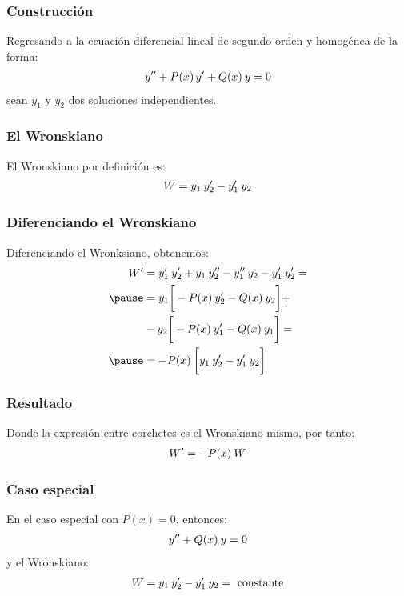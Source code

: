 \documentclass[12pt]{beamer}
\begin{document}
\begin{frame}
\frametitle{Construcción}
Regresando a la ecuación diferencial lineal de segundo orden y homogénea de la forma:
\pause
\begin{align}
{y}^{\prime \prime} + P(x) \, {y}^{\prime} + Q(x) \: y = 0
\label{eq:ecuacion_09_118}
\end{align}
sean $y_{1}$ y $y_{2}$ dos soluciones independientes.
\end{frame}
\begin{frame}
\frametitle{El Wronskiano}
El Wronskiano por definición es:
\pause
\begin{align}
W = y_{1} \: {y}^{\prime}_{2} - {y}^{\prime}_{1} \: y_{2}
\label{eq:ecuacion_09_119}
\end{align}
\end{frame}
\begin{frame}
\frametitle{Diferenciando el Wronskiano}
Diferenciando el Wronksiano, obtenemos:
\pause
\begin{eqnarray*}
\begin{aligned}
\ptilde{W} &= \ptilde{y}_{1} \: \ptilde{y}_{2} + y_{1} \: \stilde{y}_{2} - \stilde{y}_{1} \: y_{2} - \ptilde{y}_{1} \: \ptilde{y}_{2} = \\ \pause
&= y_{1} \bigg[ - P(x) \: \ptilde{y}_{2} - Q(x) \: y_{2} \bigg] + \\
&- y_{2} \bigg[ - P(x) \: \ptilde{y}_{1} - Q(x)  \: y_{1} \bigg] = \\ \pause
&= - P(x) \: \bigg[ y_{1} \: \ptilde{y}_{2} - \ptilde{y}_{1} \: y_{2} \bigg]
\end{aligned}
\end{eqnarray*}
\end{frame}
\begin{frame}
\frametitle{Resultado}
Donde la expresión entre corchetes es el Wronskiano mismo, por tanto:
\pause
\begin{align}
{W}^{\prime} = - P (x) \: W
\label{eq:ecuacion_09_120}
\end{align}
\end{frame}
\begin{frame}
\frametitle{Caso especial}
En el caso especial con $P (x) = 0$, entonces:
\pause
\begin{align}
{y}^{\prime \prime} + Q (x) \: y = 0
\label{eq:ecuacion_09_121}
\end{align}
y el Wronskiano:
\pause
\begin{align}
W = y_{1} \: {y}^{\prime}_{2} - {y}^{\prime}_{1} \: y_{2} = \mbox{ constante}
\label{eq:ecuacion_09_1202}
\end{align}
\end{frame}
\end{document}
